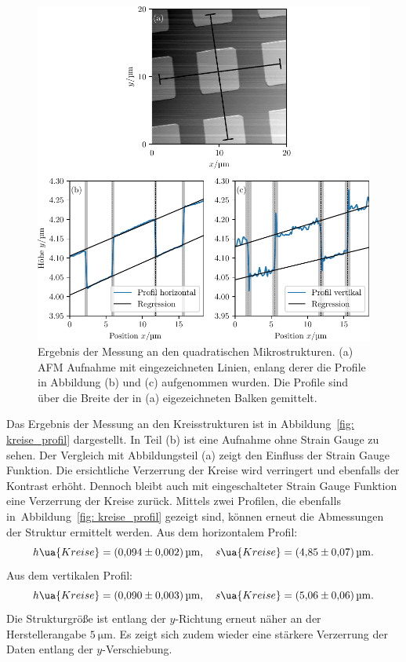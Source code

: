 \begin{figure}
  \centering
  \includegraphics[scale = 1]{../analysis/data/nanostruktur_quadrate/quadrate_profile.pdf}
  \caption{Ergebnis der Messung an den quadratischen Mikrostrukturen. (a) AFM Aufnahme mit eingezeichneten
  Linien, enlang derer die Profile in Abbildung (b) und (c) aufgenommen wurden. Die Profile sind
  über die Breite der in (a) eigezeichneten Balken gemittelt.}
  \label{fig: quadrate_profil}
\end{figure}

Das Ergebnis der Messung an den Kreisstrukturen ist in Abbildung~\ref{fig: kreise_profil} dargestellt. In Teil (b)
ist eine Aufnahme ohne Strain Gauge zu sehen. Der Vergleich mit Abbildungsteil (a) zeigt den Einfluss der Strain Gauge Funktion.
Die ersichtliche Verzerrung der Kreise wird verringert und ebenfalls der Kontrast erhöht. Dennoch bleibt auch mit eingeschalteter
Strain Gauge Funktion eine Verzerrung der Kreise zurück. Mittels zwei Profilen, die ebenfalls in~Abbildung~\ref{fig: kreise_profil}
gezeigt sind, können erneut die Abmessungen der Struktur ermittelt werden. Aus dem horizontalem Profil:
\begin{equation}
  h\ua{Kreise} = \SI{0.094(2)}{\micro\meter}, \quad s\ua{Kreise} = \SI{4.85(7)}{\micro\meter}.
\end{equation}
Aus dem vertikalen Profil:
\begin{equation}
  h\ua{Kreise} = \SI{0.090(3)}{\micro\meter}, \quad s\ua{Kreise} = \SI{5.06(6)}{\micro\meter}.
\end{equation}
Die Strukturgröße ist entlang der $y$-Richtung erneut näher an der Herstellerangabe $\SI{5}{\micro\meter}$.
Es zeigt sich zudem wieder eine stärkere Verzerrung der Daten entlang der $y$-Verschiebung.

